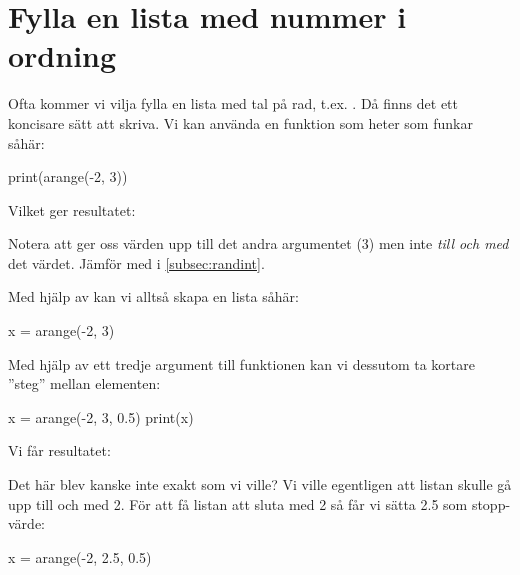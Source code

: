 \section{Fylla en lista med nummer i ordning}\label{subsec:filllist}

Ofta kommer vi vilja fylla en lista med tal på rad, t.ex. \cw{[-2 -1  0  1  2]}. Då finns det ett koncisare sätt att skriva. Vi kan använda en funktion som heter  som funkar såhär:


\begin{python}[caption={arange},label={arange1}]
print(arange(-2, 3))
\end{python}

Vilket ger resultatet:

\begin{python}[caption={arange},label={}]
[-2 -1  0  1  2]
\end{python}

Notera att  ger oss värden upp till det andra argumentet (3) men inte \emph{till och med} det värdet. Jämför med  i \autoref{subsec:randint}.

Med hjälp av  kan vi alltså skapa en lista såhär:
\begin{python}[caption={Skapa en lista som innehåller alla heltal från -2 till 2},label={}]
x = arange(-2, 3)
\end{python}

Med hjälp av ett tredje argument till funktionen  kan vi dessutom ta kortare ''steg'' mellan elementen:

\begin{python}[caption={Anpassa steglängd mellan element},label={}]
x = arange(-2, 3, 0.5)
print(x)
\end{python}

Vi får resultatet:

\vspace{10pt}
\begin{python}
[-2.  -1.5  1.  -0.5  0.  0.5  1.  1.5  2.  2.5]
\end{python}

Det här blev kanske inte exakt som vi ville? Vi ville egentligen att listan skulle gå upp till och med 2. För att få listan att sluta med 2 så får vi sätta 2.5 som stopp-värde:

\begin{python}[caption={Anpassa steglängd mellan element},label={}]
x = arange(-2, 2.5, 0.5)
\end{python}

